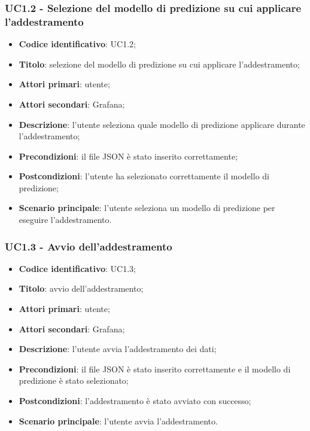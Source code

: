 \subsubsection{UC1.2 - Selezione del modello di predizione su cui applicare l'addestramento}
\begin{itemize}
	\item \textbf{Codice identificativo}: UC1.2;
	\item \textbf{Titolo}: selezione del modello di predizione su cui applicare l'addestramento;
	\item \textbf{Attori primari}: utente;
	\item \textbf{Attori secondari}: Grafana\glo;
	\item \textbf{Descrizione}: l'utente seleziona quale modello di predizione applicare durante l'addestramento;
	\item \textbf{Precondizioni}: il file JSON è stato inserito correttamente;
	\item \textbf{Postcondizioni}: l'utente ha selezionato correttamente il modello di predizione;
	\item \textbf{Scenario principale}: l'utente seleziona un modello di predizione per eseguire l'addestramento.
\end{itemize}

\subsubsection{UC1.3 - Avvio dell'addestramento}
\begin{itemize}
	\item \textbf{Codice identificativo}: UC1.3;
	\item \textbf{Titolo}: avvio dell'addestramento;
	\item \textbf{Attori primari}: utente;
	\item \textbf{Attori secondari}: Grafana\glo;
	\item \textbf{Descrizione}: l'utente avvia l'addestramento dei dati;
	\item \textbf{Precondizioni}: il file JSON è stato inserito correttamente e il modello di predizione è stato selezionato;
	\item \textbf{Postcondizioni}: l'addestramento è stato avviato con successo;
	\item \textbf{Scenario principale}: l'utente avvia l'addestramento.
\end{itemize}

